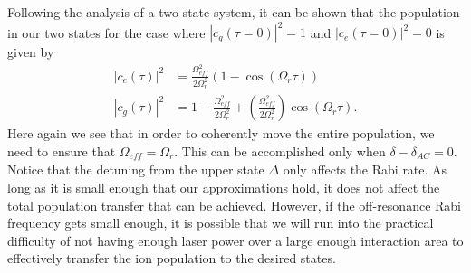 Following the analysis of a two-state system, it can be shown that the population in our two states for the case where $|c_g(\tau=0)|^2=1$ and $|c_e(\tau=0)|^2=0$ is given by 
\begin{align}
|c_e(\tau)|^2&
=\frac{\Omega_{\mathit{eff}}^2}{2\Omega_r^2}(1-\cos(\Omega_r\tau))\\
|c_g(\tau)|^2&=
1-\frac{\Omega_{\mathit{eff}}^2}{2\Omega_r^2} + \left(\frac{\Omega_{\mathit{eff}}^2}{2\Omega_r^2}\right)\cos(\Omega_r \tau).
\end{align}
Here again we see that in order to coherently move the entire population, we need to ensure that $\Omega_{\mathit{eff}}=\Omega_r$. This can be accomplished only when $\delta-\delta_{AC}=0$. Notice that the detuning from the upper state $\Delta$ only affects the Rabi rate. As long as it is small enough that our approximations hold, it does not affect the total population transfer that can be achieved. However, if the off-resonance Rabi frequency gets small enough, it is possible that we will run into the practical difficulty of not having enough laser power over a large enough interaction area to effectively transfer the ion population to the desired states.



%



